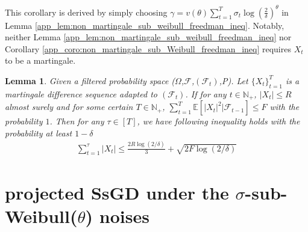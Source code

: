 \documentclass{article}
\newtheorem{lemma}{Lemma}
\def \E {\mathbb{E}}
\begin{document}
This corollary is derived by simply choosing $\gamma = v(\theta)\sum_{t=1}^T\sigma_t\log(\frac{2}{\delta})^\theta$ in Lemma \ref{app_lem:non_martingale_sub_weibull_freedman_ineq}. Notably, neither Lemma \ref{app_lem:non_martingale_sub_weibull_freedman_ineq} nor Corollary \ref{app_coro:non_martingale_sub_Weibull_freedman_ineq} requires $X_t$ to be a martingale.

\begin{lemma}{\citep{freedman1975tail}}\label{app_lem: berenstain_type_ineq}
    Given a filtered probability space ($\Omega$,$\mathcal{F}$,$(\mathcal{F}_t)$,P). Let $\{X_t\}_{t=1}^T$ is a martingale difference sequence adapted to $(\mathcal{F}_t)$. If for any $t\in\mathbb{N}_+$, $|X_t|\leq R$ almost surely and for some certain $T\in\mathbb{N_+}$, $\sum_{t=1}^T \E[|X_t|^2|\mathcal{F}_{t-1}]\leq F$ with the probability $1$. Then for any $\tau\in[T]$, we have following inequality holds with the probability at least $1-\delta$
    \begin{align}
        \sum_{t=1}^\tau\left|X_t \right| \leq \frac{2R\log(2/\delta)}{3}+ \sqrt{2F\log(2/\delta)}
    \end{align}
\end{lemma}


\section{projected SsGD under the $\sigma$-sub-Weibull($\theta$) noises}\label{sec: SsGD_subweibull}
\end{document}
